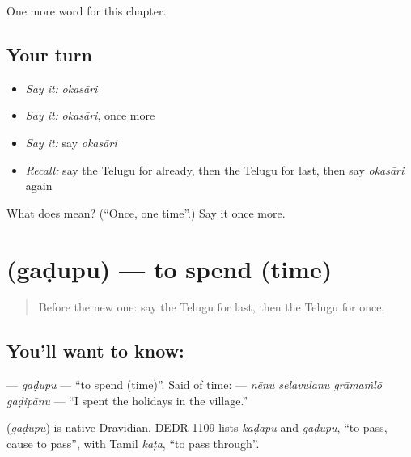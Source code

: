 \begin{grammarlens}[title={What you've built}]
One more word for this chapter.
\end{grammarlens}

\subsection*{Your turn}
\begin{itemize}
\raggedright
  \item \emph{Say it:} \emph{okasāri}
  \item \emph{Say it:} \emph{okasāri}, once more
  \item \emph{Say it:} say \emph{okasāri}
  \item \emph{Recall:} say the Telugu for already, then the Telugu for last, then say \emph{okasāri} again
\end{itemize}

\begin{tcolorbox}[breakable,colback=teal!4,colframe=teal!35!black,title={Before you move on}]
What does  mean? (\textquotedblleft{}Once, one time\textquotedblright{}.) Say it once more.
\end{tcolorbox}
\section[\texorpdfstring{\te{గడుపు} (gaḍupu)}{గడుపు (gaḍupu)}]{ (gaḍupu) — to spend (time)}

\label{lesson:TE-C154-gadupu}



\begin{quote}
Before the new one: say the Telugu for last, then the Telugu for once.
\end{quote}

\subsection*{You'll want to know: }
\textbf{} — \emph{gaḍupu} — \textquotedblleft{}to spend (time)\textquotedblright{}. Said of time: \textbf{   } — \emph{nēnu selavulanu grāmaṁlō gaḍipānu} — \textquotedblleft{}I spent the holidays in the village.\textquotedblright{}

\begin{cousinweb}
\textbf{} (\emph{gaḍupu}) is native Dravidian. DEDR 1109 lists \emph{kaḍapu} and \emph{gaḍupu}, \textquotedblleft{}to pass, cause to pass\textquotedblright{}, with Tamil \emph{kaṭa}, \textquotedblleft{}to pass through\textquotedblright{}.
\end{cousinweb}

